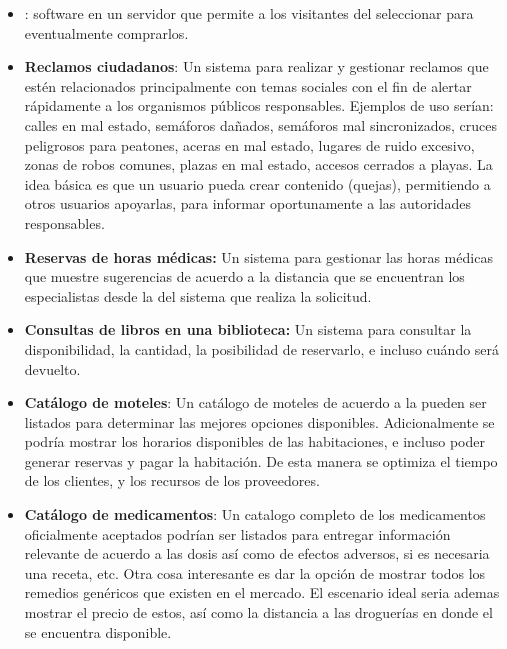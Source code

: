 \begin{itemize}
	\item
		\textbf{\shoppingCart}: \ecommerceCOM software en un servidor \webINT que permite a los visitantes del \websiteINT seleccionar \itemsCOM para eventualmente comprarlos.
	
	\item
		\textbf{Reclamos ciudadanos}: Un sistema para realizar y gestionar reclamos que estén relacionados principalmente con temas sociales con el fin de alertar rápidamente a los organismos públicos responsables. Ejemplos de uso serían: calles en mal estado, semáforos dañados, semáforos mal sincronizados, cruces peligrosos para peatones, aceras en mal estado, lugares de ruido excesivo, zonas de robos comunes, plazas en mal estado, accesos cerrados a playas. La idea básica es que un usuario pueda crear contenido (quejas), permitiendo a otros usuarios apoyarlas, para informar oportunamente a las autoridades responsables.
	
	\item 
		\textbf{Reservas de horas médicas:} Un sistema para gestionar las horas médicas que muestre sugerencias de acuerdo a la distancia que se encuentran los especialistas desde la \geoPositionCPT del sistema que realiza la solicitud. 
	
	\item
		\textbf{Consultas de libros en una biblioteca:} Un sistema para consultar la disponibilidad, la cantidad, la posibilidad de reservarlo, e incluso cuándo será devuelto.

	\item
		\textbf{Catálogo de moteles}: Un catálogo de moteles de acuerdo a la \geoPositionCPT pueden ser listados para determinar las mejores opciones disponibles. Adicionalmente se podría mostrar los horarios disponibles de las habitaciones, e incluso poder generar reservas y pagar la habitación. De esta manera se optimiza el tiempo de los clientes, y los recursos de los proveedores.
	
	\item
		\textbf{Catálogo de medicamentos}: Un catalogo completo de los medicamentos oficialmente aceptados podrían ser listados para entregar información relevante de acuerdo a las dosis así como de efectos adversos, si es necesaria una receta, etc. Otra cosa interesante es dar la opción de mostrar todos los remedios genéricos que existen en el mercado. El escenario ideal seria ademas mostrar el precio de estos, así como la distancia a las droguerías en donde el \itemCOM se encuentra disponible.
	

\end{itemize}
